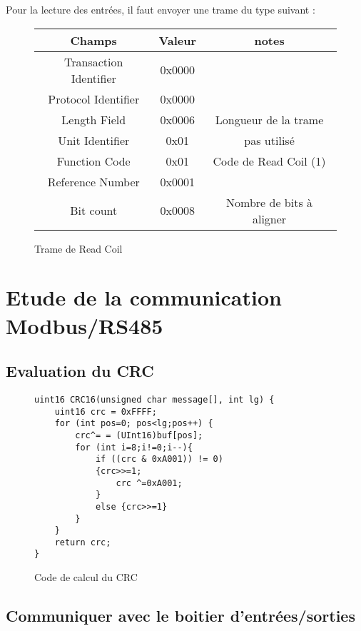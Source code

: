 \documentclass[oneside,a4paper,12pt]{article}
\begin{document}
	Pour la lecture des entrées, il faut envoyer une trame du type suivant :\\
	
	\begin{figure}[h]
		\begin{center}
			\begin{tabular}{|c|c|c|}
				\hline
				Champs & Valeur & notes\\
				\hline
				Transaction Identifier & 0x0000 & \\
				\hline
				Protocol Identifier & 0x0000 & \\
				\hline
				Length Field & 0x0006 & Longueur de la trame\\
				\hline
				Unit Identifier & 0x01 & pas utilisé\\
				\hline
				Function Code & 0x01 & Code de Read Coil (1)\\
				\hline
				Reference Number & 0x0001 &\\
				\hline
				Bit count & 0x0008 & Nombre de bits à aligner\\
				\hline
			\end{tabular}
		\end{center}
		\caption{Trame de Read Coil}
	\end{figure} 
	
	\section{Etude de la communication Modbus/RS485}
	
	\subsection{Evaluation du CRC}
	
	\begin{figure}[h]
	\begin{lstlisting}
uint16 CRC16(unsigned char message[], int lg) {
	uint16 crc = 0xFFFF;
	for (int pos=0; pos<lg;pos++) {
		crc^= = (UInt16)buf[pos];
		for (int i=8;i!=0;i--){
			if ((crc & 0xA001)) != 0)
			{crc>>=1;
				crc ^=0xA001;
			}
			else {crc>>=1}
		}
	}
	return crc;
}
	\end{lstlisting}
	\caption{Code de calcul du CRC}
	\end{figure}
	
	\subsection{Communiquer avec le boitier d'entrées/sorties}
	
\end{document}
